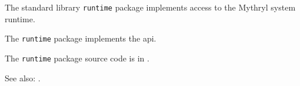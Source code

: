 
The standard library {\tt runtime} package implements access to the Mythryl system runtime.

The {\tt runtime} package implements the  api.

The {\tt runtime} package source code is in .

See also:  .


